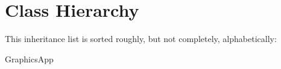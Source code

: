 \section{Class Hierarchy}
This inheritance list is sorted roughly, but not completely, alphabetically\+:\begin{DoxyCompactList}
\item Graphics\+App\begin{DoxyCompactList}
\item {}
\end{DoxyCompactList}
\item {}
\item {}
\end{DoxyCompactList}
